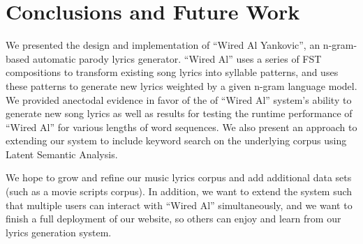\documentclass{vgtc}                          %
\begin{document}
\section{Conclusions and Future Work}

We presented the design and implementation of ``Wired Al Yankovic'',
an n-gram-based automatic parody lyrics generator. ``Wired Al''
uses a series of FST compositions to transform existing
song lyrics into syllable patterns, and uses these patterns
to generate new lyrics weighted by a given n-gram language model.
We provided anectodal evidence in favor of the of ``Wired Al''
system's ability to generate new song lyrics as well as results
for testing the runtime performance of ``Wired Al'' for
various lengths of word sequences. We also present an approach
to extending our system to include keyword search on the underlying
corpus using Latent Semantic Analysis.

We hope to grow and refine our music lyrics corpus and add additional
data sets (such as a movie scripts corpus). In addition, we want
to extend the system such that multiple users can interact with
``Wired Al'' simultaneously, and we want to finish a full deployment
of our website, so others can enjoy and learn from our lyrics generation
system.

%


\end{document}
